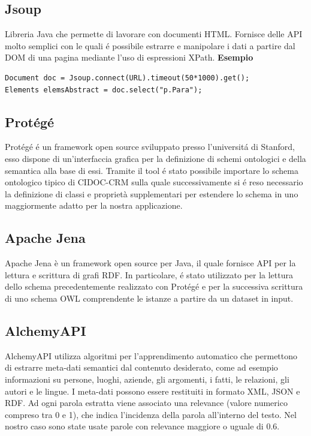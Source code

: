 \documentclass[11pt,a4paper]{article}
\begin{document}
\subsection{Jsoup}
Libreria Java che permette di lavorare con documenti HTML. Fornisce delle API molto semplici con le quali \'e possibile estrarre e manipolare i dati a partire dal DOM di una pagina mediante l'uso di espressioni XPath. 
\newline \newline 
\textbf  {Esempio}
\begin{lstlisting}
Document doc = Jsoup.connect(URL).timeout(50*1000).get();
Elements elemsAbstract = doc.select("p.Para");
\end{lstlisting} 

\subsection{Prot\'eg\'e}
Prot\'eg\'e \'e un framework open source sviluppato presso l'universit\'a di Stanford, esso dispone di un'interfaccia grafica per la definizione di schemi ontologici e della semantica alla base di essi. Tramite il tool \'e stato possibile importare lo schema ontologico tipico di CIDOC-CRM sulla quale successivamente si \'e reso necessario la definizione di classi e proprietà supplementari per estendere lo schema in uno maggiormente adatto per la nostra applicazione.

\subsection{Apache Jena}
Apache Jena è un framework open source per Java, il quale fornisce API per la lettura e scrittura di grafi RDF. In particolare, \'e stato utilizzato per la lettura dello schema precedentemente realizzato con Prot\'eg\'e e per la successiva scrittura di uno schema OWL comprendente le istanze a partire da un dataset in input.

\subsection{AlchemyAPI}
AlchemyAPI utilizza algoritmi per  l'apprendimento automatico che permettono di  estrarre meta-dati semantici dal contenuto desiderato, come ad esempio informazioni su persone, luoghi, aziende, gli argomenti, i fatti, le relazioni, gli autori e le lingue. I meta-dati possono essere restituiti in formato XML, JSON e RDF. \newline
Ad ogni parola estratta viene associato una relevance (valore numerico compreso tra 0 e 1), che indica l'incidenza della parola all'interno del testo.
Nel nostro caso sono state usate parole con relevance maggiore o uguale di 0.6. 
\end{document}
